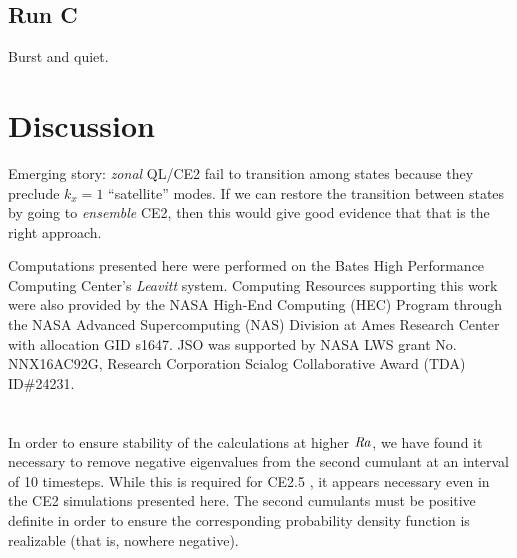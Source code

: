 \documentclass{jfm}
\newcommand{\Rayleigh}{\mbox{\textit{Ra}}}  %
\begin{document}
\subsection{Run C}
\label{sec:run_c_dns_ce2}

Burst and quiet.

\section{Discussion}
\label{sec:discussion}

Emerging story: \emph{zonal} QL/CE2 fail to transition among states because they preclude $k_x = 1$ ``satellite'' modes. If we can restore the transition between states by going to \emph{ensemble} CE2, then this would give good evidence that that is the right approach.


Computations presented here were performed on the Bates High Performance Computing Center's \emph{Leavitt} system.
Computing Resources supporting this work were also provided by the NASA High-End Computing (HEC) Program through the NASA Advanced Supercomputing (NAS) Division at Ames Research Center with allocation GID s1647.
JSO was supported by NASA LWS grant No. NNX16AC92G, Research Corporation Scialog Collaborative Award (TDA) ID\#24231.


\appendix
\section{}\label{appA}
In order to ensure stability of the calculations at higher $\Rayleigh$, we have found it necessary to remove negative eigenvalues from the second cumulant at an interval of 10 timesteps.
While this is required for CE2.5 \citep{marston_qi_tobias_2019}, it appears necessary even in the CE2 simulations presented here.
The second cumulants must be positive definite in order to ensure the corresponding probability density function is realizable (that is, nowhere negative).




\end{document}
